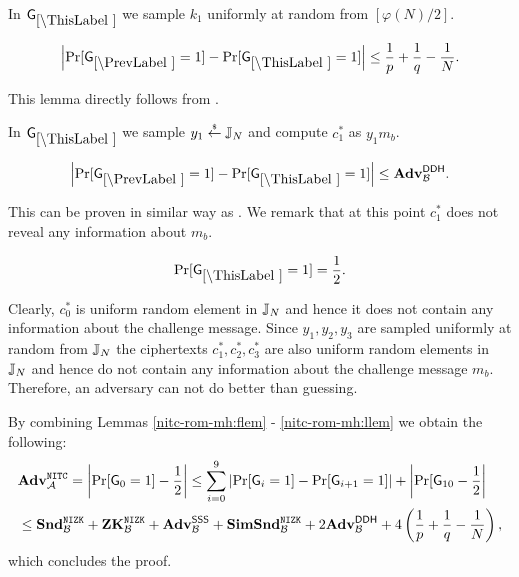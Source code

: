 %
%
%

In $\games_\thisgame$ we sample $k_1$ uniformly at random from $[\varphi(N)/2]$. 

\begin{lemma}
\[
\left|\Pr[\games_\prevgame = 1] - \Pr[\games_\thisgame = 1]\right| \leq \frac{1}{p}+\frac{1}{q}-\frac{1}{N}.
\]
\end{lemma}

This lemma directly follows from .

In $\games_\thisgame$ we sample $y_1 \stackrel{{\scriptscriptstyle\$}}{\leftarrow} \mathbb{J}_N$ and compute $c_1^*$ as  $y_1 m_b$. 

\begin{lemma}
\[
\left|\Pr[\games_\prevgame = 1] - \Pr[\games_\thisgame = 1]\right| \leq \advtg_\advB^\ddh.
\]
\end{lemma}
This can be proven in similar way as . We remark that at this point $c_1^*$ does not reveal any information about $m_b$.

\begin{lemma}\label{nitc-rom-mh:llem}
\[
\Pr[\games_\thisgame = 1] = \half.
\]
\end{lemma}

Clearly, $c_0^*$ is uniform random element in $\mathbb{J}_N$ and hence it does not contain any information about the challenge message. Since $y_1, y_2, y_3$ are sampled uniformly at random from $\mathbb{J}_N$ the ciphertexts $c_1^*, c_2^*, c_3^*$ are also uniform random elements in $\mathbb{J}_N$ and hence do not contain any information about the challenge message $m_b$. Therefore, an adversary can not do better than guessing.

By combining Lemmas \ref{nitc-rom-mh:flem} - \ref{nitc-rom-mh:llem} we obtain the following:
\begin{align*}
&\mathbf{Adv}^{\mathtt{NITC}}_{\mathcal{A}} = \left| \Pr[\mathsf{G}_0 = 1] - \frac{1}{2} \right| \leq \sum_{i=0}^9 \left|\Pr[\mathsf{G}_i = 1] - \Pr[\mathsf{G}_{i+1} = 1] \right| + \left|\Pr[\mathsf{G}_{10}- \frac{1}{2}\right| \\
 &\leq \mathbf{Snd}^{\mathtt{NIZK}}_{\mathcal{B}} + \mathbf{ZK}^{\mathtt{NIZK}}_{\mathcal{B}} + \mathbf{Adv}^{\mathsf{SSS}}_{\mathcal{B}} + \mathbf{SimSnd}^{\mathtt{NIZK}}_{\mathcal{B}} + 2 \mathbf{Adv}^{\mathsf{DDH}}_{\mathcal{B}} + 4 \left( \frac{1}{p}+\frac{1}{q}-\frac{1}{N} \right),
\end{align*}
which concludes the proof.




